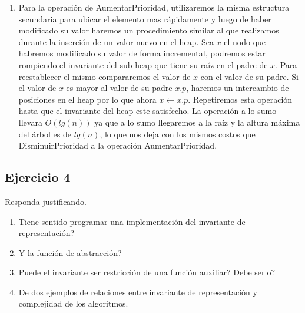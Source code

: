 \documentclass[10pt, a4paper]{article}
\begin{document}
\begin{enumerate}
 \item Para la operaci\'on de AumentarPrioridad, utilizaremos la misma estructura secundaria para ubicar el elemento mas r\'apidamente y luego de haber modificado su valor haremos un procedimiento similar al que realizamos durante la inserci\'on de un valor nuevo en el heap. Sea $x$ el nodo que habremos modificado su valor de forma incremental, podremos estar rompiendo el invariante del sub-heap que tiene su ra\'iz en el padre de $x$. Para reestablecer el mismo compararemos el valor de $x$ con el valor de su padre. Si el valor de $x$ es mayor al valor de su padre $x.p$, haremos un intercambio de posiciones en el heap por lo que ahora $x \gets x.p$. Repetiremos esta operaci\'on hasta que el invariante del heap este satisfecho. La operaci\'on a lo sumo llevara $O(lg(n))$ ya que a lo sumo llegaremos a la ra\'iz y la altura m\'axima del \'arbol es de $lg(n)$, lo que nos deja con los mismos costos que DisminuirPrioridad a la operaci\'on AumentarPrioridad.
\end{enumerate}

\subsection*{Ejercicio 4}

Responda justificando.
\begin{enumerate}
 \item Tiene sentido programar una implementaci\'on del invariante de representaci\'on?
 \item Y la funci\'on de abstracci\'on?
 \item Puede el invariante ser restricci\'on de una funci\'on auxiliar? Debe serlo?
 \item De dos ejemplos de relaciones entre invariante de representaci\'on y complejidad de los algoritmos.
\end{enumerate}
\end{document}
